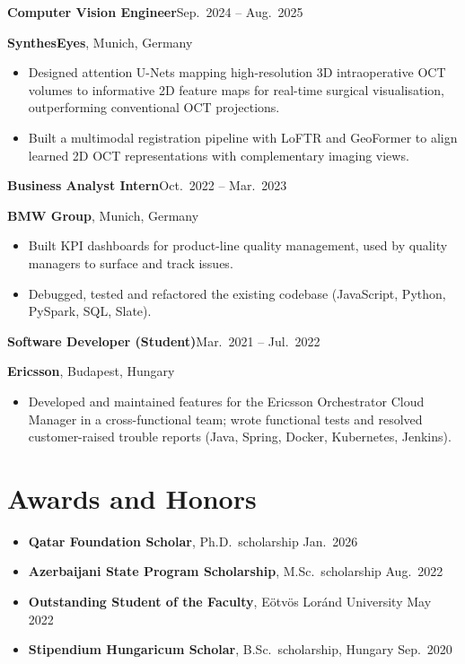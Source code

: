 \documentclass[11pt]{article}
\newcommand{\job}[4]{%
  \textbf{#1}\hfill #2\par
  \textbf{#3}, #4\par}
\begin{document}
\job{Computer Vision Engineer}{Sep.\ 2024 -- Aug.\ 2025}{SynthesEyes}{Munich, Germany}
\begin{itemize}
  \item Designed attention U-Nets mapping high-resolution 3D intraoperative OCT volumes to informative 2D feature maps
        for real-time surgical visualisation, outperforming conventional OCT projections.
  \item Built a multimodal registration pipeline with LoFTR and GeoFormer to align learned 2D OCT representations with
        complementary imaging views.
\end{itemize}

\job{Business Analyst Intern}{Oct.\ 2022 -- Mar.\ 2023}{BMW Group}{Munich, Germany}
\begin{itemize}
  \item Built KPI dashboards for product-line quality management, used by quality managers to surface and track issues.
  \item Debugged, tested and refactored the existing codebase (JavaScript, Python, PySpark, SQL, Slate).
\end{itemize}

\job{Software Developer (Student)}{Mar.\ 2021 -- Jul.\ 2022}{Ericsson}{Budapest, Hungary}
\begin{itemize}
  \item Developed and maintained features for the Ericsson Orchestrator Cloud Manager in a cross-functional team;
        wrote functional tests and resolved customer-raised trouble reports (Java, Spring, Docker, Kubernetes, Jenkins).
\end{itemize}

\section{Awards and Honors}
\begin{itemize}
  \item \textbf{Qatar Foundation Scholar}, Ph.D.\ scholarship \hfill Jan.\ 2026
  \item \textbf{Azerbaijani State Program Scholarship}, M.Sc.\ scholarship \hfill Aug.\ 2022
  \item \textbf{Outstanding Student of the Faculty}, Eötvös Loránd University \hfill May 2022
  \item \textbf{Stipendium Hungaricum Scholar}, B.Sc.\ scholarship, Hungary \hfill Sep.\ 2020
\end{itemize}
\end{document}
